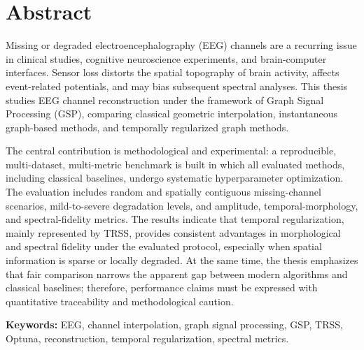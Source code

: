 \chapter*{Abstract}
Missing or degraded electroencephalography (EEG) channels are a recurring issue in clinical studies, cognitive neuroscience experiments, and brain-computer interfaces. Sensor loss distorts the spatial topography of brain activity, affects event-related potentials, and may bias subsequent spectral analyses. This thesis studies EEG channel reconstruction under the framework of Graph Signal Processing (GSP), comparing classical geometric interpolation, instantaneous graph-based methods, and temporally regularized graph methods.

The central contribution is methodological and experimental: a reproducible, multi-dataset, multi-metric benchmark is built in which all evaluated methods, including classical baselines, undergo systematic hyperparameter optimization. The evaluation includes random and spatially contiguous missing-channel scenarios, mild-to-severe degradation levels, and amplitude, temporal-morphology, and spectral-fidelity metrics. The results indicate that temporal regularization, mainly represented by TRSS, provides consistent advantages in morphological and spectral fidelity under the evaluated protocol, especially when spatial information is sparse or locally degraded. At the same time, the thesis emphasizes that fair comparison narrows the apparent gap between modern algorithms and classical baselines; therefore, performance claims must be expressed with quantitative traceability and methodological caution.

\textbf{Keywords:} EEG, channel interpolation, graph signal processing, GSP, TRSS, Optuna, reconstruction, temporal regularization, spectral metrics.
